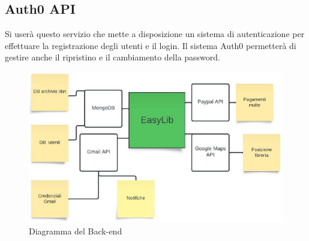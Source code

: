 \documentclass{article}
\begin{document}
\subsection*{Auth0 API}
Si userà questo servizio che mette a disposizione un sistema di autenticazione per effettuare la registrazione degli utenti e il login. Il sistema Auth0 permetterà di gestire anche il ripristino e
il cambiamento della password.

\begin{figure}[H]
    \centering
    \includegraphics[width=130mm]{D1/Images/backend.png}
    \caption{Diagramma del Back-end}
\end{figure}
\end{document}
